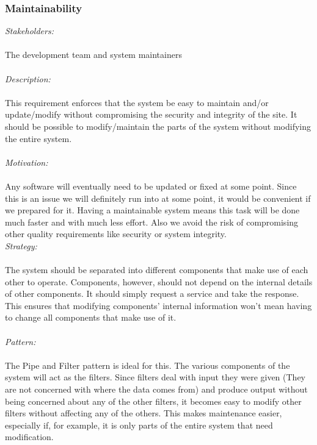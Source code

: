 \documentclass[a4paper,12pt]{report}
\begin{document}
		\subsubsection{Maintainability}
		\emph{Stakeholders: }\\\\ The development team and system maintainers \\
		\\\emph{Description: }\\\\ This requirement enforces that the system be easy to maintain and/or update/modify without compromising the security and integrity of the site. It should be possible to modify/maintain the parts of the system without modifying the entire system. \\
		\\\emph{Motivation: }\\\\ Any software will eventually need to be updated or fixed at some point. Since this is an issue we will definitely run into at some point, it would be convenient if we prepared for it. Having a maintainable system means this task will be done much faster and with much less effort. Also we avoid the risk of compromising other quality requirements like security or system integrity. \\ 
		 
		\emph{Strategy: }\\\\ The system should be separated into different components that make use of each other to operate. Components, however, should not depend on the internal details of other components. It should simply request a service and take the response. This ensures that modifying components’ internal information won’t mean having to change all components that make use of it. \\
		\\\emph{Pattern: }\\\\ The Pipe and Filter pattern is ideal for this. The various components of the system will act as the filters. Since filters deal with input they were given (They are not concerned with where the data comes from) and produce output without being concerned about any of the other filters, it becomes easy to modify other filters without affecting any of the others. This makes maintenance easier, especially if, for example, it is only parts of the entire system that need modification.		
			
\end{document}
